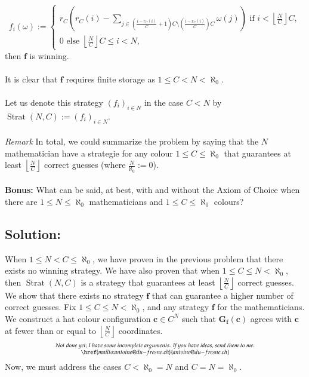 \documentclass[11pt, a4paper, oneside]{article}
\newcommand{\solution}[1][]{\subsection*{#1}\hfill \par}
\theoremstyle{remark}
\theoremstyle{lemma}
\begin{document}
\[
f_i(\omega) := \begin{cases}
r_{C}\left(r_{C}(i) - \sum_{j \in \left(\frac{i-r_{C}(i)}{C}+1\right) C\setminus\left(\frac{i-r_{C}(i)}{C}\right)C} \omega(j)\right)  \text{ if }  i<\left\lfloor\frac{N}{C}\right\rfloor C,\\
0   \text{ else } \left\lfloor\frac{N}{C}\right\rfloor C\leq i<N,
\end{cases}
\]
then \(\mathbf{f}\) is winning.
\\\\
It is clear that \(\mathbf{f}\) requires finite storage as $1\leq C<N<\aleph_0$.
\\\\
Let us denote this strategy \(\left(f_i\right)_{i \in N}\) in the case \(C < N\) by \(\operatorname{Strat}(N, C) := \left(f_i\right)_{i \in N}\).
\\\\
\textit{Remark}
In total, we could summarize the problem by saying that the $N$ mathematician have a strategie for any colour $1\leq C\leq\aleph_0$ that guarantees at least $\left\lfloor\frac{N}{C}\right\rfloor$ correct guesses (where $\frac{N}{\aleph_0}:=0$).
\\\\
\textbf{Bonus:} What can be said, at best, with and without the Axiom of Choice when there are \(\left.1\leq N\leq \aleph_0\right.\) mathematicians and \(\left.1\leq C\leq \aleph_0\right.\) colours?
\solution[Solution:]
When \(\left.1\leq N<C\leq\aleph_0\right.\), we have proven in the previous problem that there exists no winning strategy. We have also proven that when \(\left.1\leq C\leq N<\aleph_0\right.\), then \(\operatorname{Strat}(N,C)\) is a strategy that guarantees at least \(\left\lfloor\frac{N}{C}\right\rfloor\) correct guesses. We show that there exists no strategy \(\mathbf{f}\) that can guarantee a higher number of correct guesses. Fix \(\left.1\leq C\leq N<\aleph_0\right.\), and any strategy \(\mathbf{f}\) for the mathematicians. We construct a hat colour configuration \(\mathbf{c} \in C^N\) such that \(\mathbf{G}_{\mathbf{f}}\left(\mathbf{c}\right)\) agrees with \(\mathbf{c}\) at fewer than or equal to \(\left\lfloor\frac{N}{C}\right\rfloor\) coordinates.
\[
\substack{\textit{Not done yet; I have some incomplete arguments. If you have ideas, send them to me:} \\ \href{mailto:antoine@du-fresne.ch}{antoine@du-fresne.ch}}
\]
Now, we must address the cases \(\left.C<\aleph_0=N\right.\) and \(\left.C=N=\aleph_0\right.\).
\\\\
\end{document}
